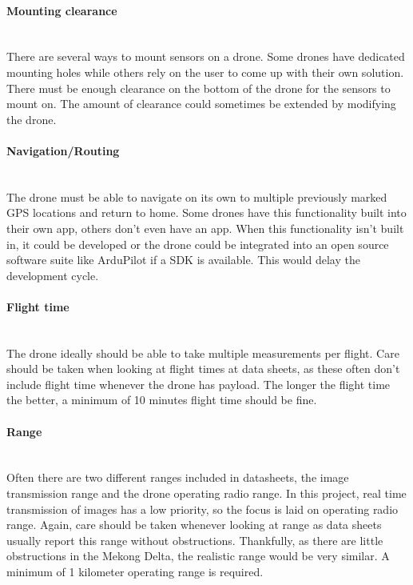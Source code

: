 \paragraph{Mounting clearance}\mbox{} \\
There are several ways to mount sensors on a drone. Some drones have dedicated mounting holes while others rely on the user to come up with their own solution. There must be enough clearance on the bottom of the drone for the sensors to mount on. The amount of clearance could sometimes be extended by modifying the drone.

\paragraph{Navigation/Routing}\mbox{} \\
The drone must be able to navigate on its own to multiple previously marked GPS locations and return to home. Some drones have this functionality built into their own app, others don't even have an app. When this functionality isn't built in, it could be developed or the drone could be integrated into an open source software suite like ArduPilot \cite{ardupilot} if a SDK is available. This would delay the development cycle.
\newpage
\paragraph{Flight time}\mbox{} \\
The drone ideally should be able to take multiple measurements per flight. Care should be taken when looking at flight times at data sheets, as these often don't include flight time whenever the drone has payload. The longer the flight time the better, a minimum of 10 minutes flight time should be fine.

\paragraph{Range}\mbox{} \\
Often there are two different ranges included in datasheets, the image transmission range and the drone operating radio range. In this project, real time transmission of images has a low priority, so the focus is laid on operating radio range. Again, care should be taken whenever looking at range as data sheets usually report this range without obstructions. Thankfully, as there are little obstructions in the Mekong Delta, the realistic range would be very similar. A minimum of 1 kilometer operating range is required.

